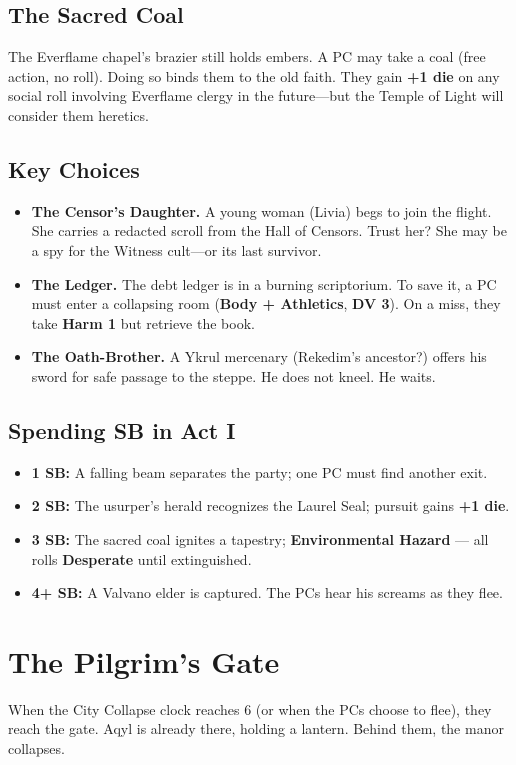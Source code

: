 \documentclass[11pt]{book}
\begin{document}
\subsection*{The Sacred Coal}
The Everflame chapel's brazier still holds embers. A PC may take a coal (free action, no roll). Doing so binds them to the old faith. They gain \textbf{+1 die} on any social roll involving Everflame clergy in the future---but the Temple of Light will consider them heretics.

\subsection*{Key Choices}
\begin{itemize}
\item \textbf{The Censor's Daughter.} A young woman (Livia) begs to join the flight. She carries a redacted scroll from the Hall of Censors. Trust her? She may be a spy for the Witness cult---or its last survivor.
\item \textbf{The Ledger.} The debt ledger is in a burning scriptorium. To save it, a PC must enter a collapsing room (\textbf{Body + Athletics}, \textbf{DV 3}). On a miss, they take \textbf{Harm 1} but retrieve the book.
\item \textbf{The Oath-Brother.} A Ykrul mercenary (Rekedim's ancestor?) offers his sword for safe passage to the steppe. He does not kneel. He waits.
\end{itemize}

\subsection*{Spending SB in Act I}
\begin{itemize}
    \item \textbf{1 SB:} A falling beam separates the party; one PC must find another exit.
    \item \textbf{2 SB:} The usurper's herald recognizes the Laurel Seal; pursuit gains \textbf{+1 die}.
    \item \textbf{3 SB:} The sacred coal ignites a tapestry; \textbf{Environmental Hazard} --- all rolls \textbf{Desperate} until extinguished.
    \item \textbf{4+ SB:} A Valvano elder is captured. The PCs hear his screams as they flee.
\end{itemize}

\section*{The Pilgrim's Gate}
When the City Collapse clock reaches 6 (or when the PCs choose to flee), they reach the gate. Aqyl is already there, holding a lantern. Behind them, the manor collapses.
\end{document}
